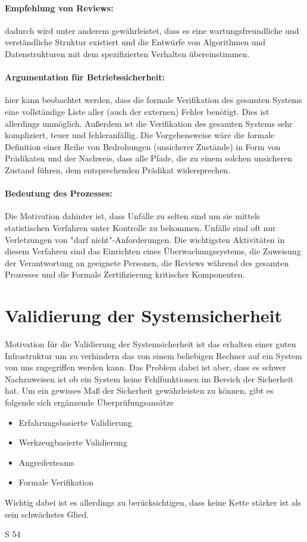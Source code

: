 \paragraph{Empfehlung von Reviews:} dadurch wird unter anderem gewährleistet, dass es eine wartungsfreundliche und verständliche Struktur existiert und die Entwürfe von Algorithmen und Datenstrukturen mit dem spezifizierten Verhalten übereinstimmen.  

\paragraph{Argumentation für Betriebssicherheit: } hier kann beobachtet werden, dass die formale Verifikation des gesamten Systems eine vollständige Liste aller (auch der externen) Fehler benötigt. Dies ist allerdings unmöglich.  Außerdem ist die Verifikation des gesamten Systems sehr kompliziert, teuer und fehleranfällig. Die Vorgehensweise wäre die formale Definition einer Reihe von Bedrohungen (unsicherer Zustände) in Form von Prädikaten und der Nachweis, dass alle Pfade, die zu einem solchen unsicheren Zustand führen, dem entsprechenden Prädikat widersprechen. 

\paragraph{Bedeutung des Prozesses: } 
Die Motivation dahinter ist, dass Unfälle zu selten sind um sie mittels statistischen Verfahren unter Kontrolle zu bekommen. Unfälle sind oft nur Verletzungen von "darf nicht"-Anforderungen. Die wichtigsten Aktivitäten in diesem Verfahren sind das Einrichten eines Überwachungssystems, die Zuweisung der Verantwortung an geeignete Personen, die Reviews während des gesamten Prozesses und die Formale Zertifizierung kritischer Komponenten.


\section{Validierung der Systemsicherheit}
Motivation für die Validierung der Systemsicherheit  ist das erhalten einer guten Infrastruktur um zu verhindern das von einem beliebigen Rechner auf ein System von uns zugegriffen werden kann. Das Problem dabei ist aber, dass es schwer  Nachzuweisen ist ob ein System keine Fehlfunktionen im Bereich der Sicherheit hat. Um ein gewisses Maß der Sicherheit gewährleisten zu können, gibt es folgende sich ergänzende Überprüfungsansätze
\begin{itemize}
\item Erfahrungsbasierte Validierung
\item Werkzeugbasierte Validierung
\item Angreiferteams
\item Formale Verifikation
\end{itemize}

Wichtig dabei ist es allerdings zu berücksichtigen, dass keine Kette stärker ist als sein schwächstes Glied.

S 54